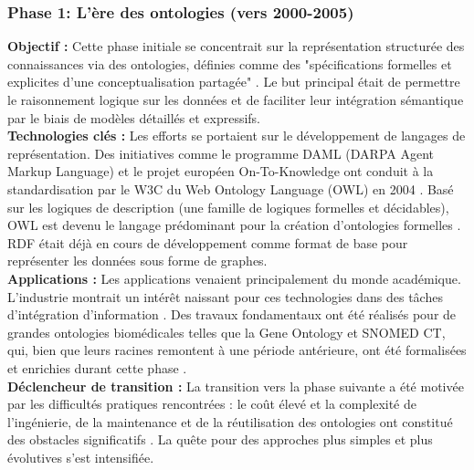 \documentclass[9pt,twocolumn,twoside,french]{opticajnl}
\begin{document}
\subsubsection{Phase 1: L'ère des ontologies (vers 2000-2005)}
\textbf{Objectif :} Cette phase initiale se concentrait sur la représentation structurée des connaissances via des ontologies, définies comme des "spécifications formelles et explicites d'une conceptualisation partagée" \citep{Gruber1993A}. Le but principal était de permettre le raisonnement logique sur les données et de faciliter leur intégration sémantique par le biais de modèles détaillés et expressifs. \\
\textbf{Technologies clés :} Les efforts se portaient sur le développement de langages de représentation. Des initiatives comme le programme DAML (DARPA Agent Markup Language) et le projet européen On-To-Knowledge ont conduit à la standardisation par le W3C du Web Ontology Language (OWL) en 2004 \citep{Hitzler2021}. Basé sur les logiques de description (une famille de logiques formelles et décidables), OWL est devenu le langage prédominant pour la création d'ontologies formelles \citep{Hitzler2010Foundations}. RDF était déjà en cours de développement comme format de base pour représenter les données sous forme de graphes. \\
\textbf{Applications :} Les applications venaient principalement du monde académique. L'industrie montrait un intérêt naissant pour ces technologies dans des tâches d'intégration d'information \citep{Hitzler2021}. Des travaux fondamentaux ont été réalisés pour de grandes ontologies biomédicales telles que la Gene Ontology et SNOMED CT, qui, bien que leurs racines remontent à une période antérieure, ont été formalisées et enrichies durant cette phase \citep{Hitzler2021}. \\
\textbf{Déclencheur de transition :} La transition vers la phase suivante a été motivée par les difficultés pratiques rencontrées : le coût élevé et la complexité de l'ingénierie, de la maintenance et de la réutilisation des ontologies ont constitué des obstacles significatifs \citep{Hitzler2021}. La quête pour des approches plus simples et plus évolutives s'est intensifiée.
\end{document}
